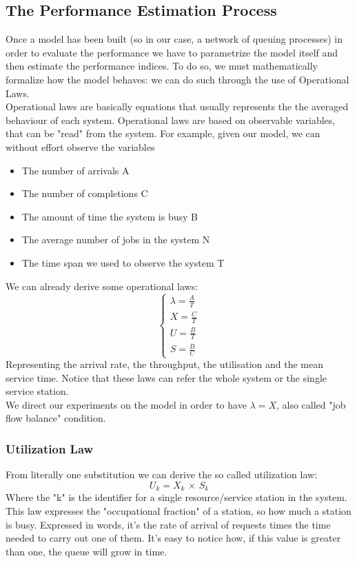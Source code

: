\documentclass[10pt,a4paper]{article}
\begin{document}
			\subsection{The Performance Estimation Process}
				Once a model has been built (so in our case, a network of queuing processes) in order to evaluate the performance we have to parametrize the model itself and then estimate the performance indices. To do so, we must mathematically formalize how the model behaves: we can do such through the use of Operational Laws.\\
				Operational laws are basically equations that usually represents the the averaged behaviour of each system. Operational laws are based on observable variables, that can be "read" from the system. For example, given our model, we can without effort observe the variables
				\begin{itemize}
					\item The number of arrivals A
					\item The number of completions C
					\item The amount of time the system is busy B
					\item The average number of jobs in the system N
					\item The time span we used to observe the system T
				\end{itemize}
				We can already derive some operational laws:
				\begin{equation}
					\begin{cases}
						\lambda = \frac{A}{T} \\
						X = \frac{C}{T} \\
						U = \frac{B}{T} \\
						S = \frac{B}{C}
					\end{cases}
				\end{equation}
				Representing the arrival rate, the throughput, the utilisation and the mean service time. Notice that these laws can refer the whole system or the single service station.\\
				We direct our experiments on the model in order to have $\lambda = X$, also called "job flow balance" condition.
				
				\subsubsection{Utilization Law}
					From literally one substitution we can derive the so called utilization law:
					\begin{equation}
						U_k = X_k \,\times\, S_k
					\end{equation} 
					Where the "k" is the identifier for a single resource/service station in the system. This law expresses the "occupational fraction" of a station, so how much a station is busy. Expressed in words, it's the rate of arrival of requests times the time needed to carry out one of them. It's easy to notice how, if this value is greater than one, the queue will grow in time.
					
\end{document}
